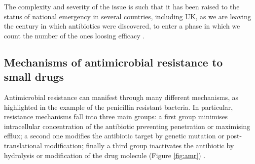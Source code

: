 The complexity and severity of the issue is such that it has been raised to the status of national emergency in several countries, including UK, as we are leaving the century in which antibiotics were discovered, to enter a phase in which we count the number of the ones loosing efficacy \cite{Oneill2016}.


\subsection{Mechanisms of antimicrobial resistance to small drugs} \label{sec:AMR_mechs}

Antimicrobial resistance can manifest through many different mechanisms, as highlighted in the example of the penicillin resistant bacteria.
%
In particular, resistance mechanisms fall into three main groups: a first group minimises intracellular concentration of the antibiotic preventing penetration or maximising efflux; a second one modifies the antibiotic target by genetic mutation or post-translational modification; finally a third group inactivates the antibiotic by hydrolysis or modification of the drug molecule (Figure \ref{fig:amr}) \cite{Blair2014}.

